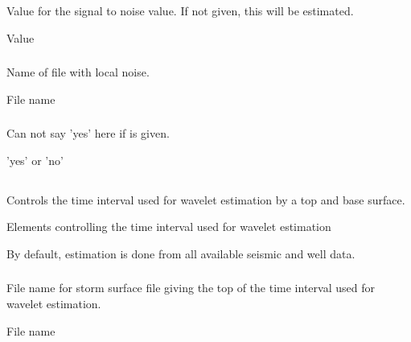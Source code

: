 \subsubsection{}
 \slist
   \item \Description Value for the signal to noise value. If not given, this will be estimated.
   \item \Argument Value
   \item \Default
 \elist

\subsubsection{}
 \slist
   \item \Description Name of file with local noise.
   \item \Argument File name
   \item \Default
 \elist

\subsubsection{}
 \slist
   \item \Description Can not say 'yes' here if  is given.
   \item \Argument 'yes' or 'no'
   \item \Default
 \elist

\subsection{}
 \slist
   \item \Description Controls the time interval used for wavelet estimation by a top and base surface.
   \item \Argument Elements controlling the time interval used for wavelet estimation
   \item \Default By default, estimation is done from all available seismic and well data.
 \elist

\subsubsection{}
 \slist
   \item \Description File name for storm surface file giving the top of the time interval used for wavelet estimation.
   \item \Argument File name
   \item \Default
 \elist


